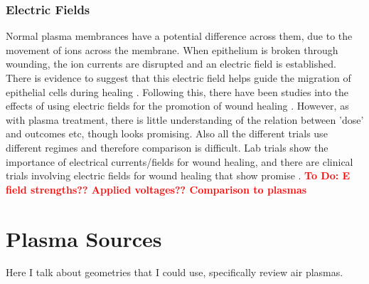 \documentclass[11pt, oneside]{article}   	%
\newcommand{\todo}[1]{ \textcolor{red}{\bf{To Do:} #1}}
\begin{document}
%
%


\subsubsection{Electric Fields}

Normal plasma membrances have a potential difference across them, due to the movement of ions across the membrane.
When epithelium is broken through wounding, the ion currents are disrupted and an electric field is established.
There is evidence to suggest that this electric field helps guide the migration of epithelial cells during healing \cite{Zhao2009electrical}.
Following this, there have been studies into the effects of using electric fields for the promotion of wound healing \cite{Thakral2013electrical, Messerli2011extracellular}.
However, as with plasma treatment, there is little understanding of the relation between 'dose' and outcomes etc, though looks promising.
Also all the different trials use different regimes and therefore comparison is difficult.
Lab trials show the importance of electrical currents/fields for wound healing, and there are clinical trials involving electric fields for wound healing that show promise \cite{Messerli2011extracellular}.
\todo{E field strengths?? Applied voltages?? Comparison to plasmas}


\section{Plasma Sources}
Here I talk about geometries that I could use, specifically review air plasmas.
\end{document}
